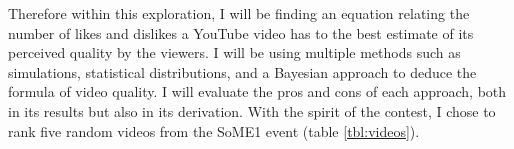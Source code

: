 \documentclass[a4paper,11pt]{article}
\begin{document}

Therefore within this exploration, I will be finding an equation relating the number of likes and dislikes a YouTube video has to the best estimate of its perceived quality by the viewers. I will be using multiple methods such as simulations, statistical distributions, and a Bayesian approach to deduce the formula of video quality. I will evaluate the pros and cons of each approach, both in its results but also in its derivation. With the spirit of the contest, I chose to rank five random videos from the SoME1 event (table \ref{tbl:videos}).





\end{document}
